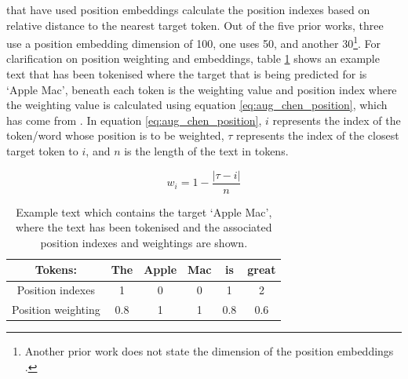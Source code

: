 that have used position embeddings calculate the position indexes based on relative distance to the nearest target token. Out of the five prior works, three use a position embedding dimension of 100, one uses 50, and another 30\footnote{Another prior work does not state the dimension of the position embeddings \citep{du-etal-2019-capsule}.}.  For clarification on position weighting and embeddings, table \ref{tab:aug_examples_position_indexes_weighting} shows an example text that has been tokenised where the target that is being predicted for is `Apple Mac', beneath each token is the weighting value and position index where the weighting value is calculated using equation \ref{eq:aug_chen_position}, which has come from \citet{chen-etal-2017-recurrent}. In equation \ref{eq:aug_chen_position}, $i$ represents the index of the token/word whose position is to be weighted, $\tau$ represents the index of the closest target token to $i$, and $n$ is the length of the text in tokens. 

\begin{equation}
    w_i = 1 - \frac{|\tau - i|}{n}
    \label{eq:aug_chen_position}
\end{equation}

\begin{table}[!h]
    \centering
    \begin{tabular}{|c|c|c|c|c|c|}
    \hline
         Tokens: & The & Apple & Mac & is & great  \\
    \hline
         Position indexes & 1 & 0 & 0 & 1 & 2 \\
    \hline
         Position weighting & 0.8 & 1 & 1 & 0.8 & 0.6 \\
    \hline
    \end{tabular}
    \caption{Example text which contains the target `Apple Mac', where the text has been tokenised and the associated position indexes and weightings are shown.}
    \label{tab:aug_examples_position_indexes_weighting}
\end{table}


